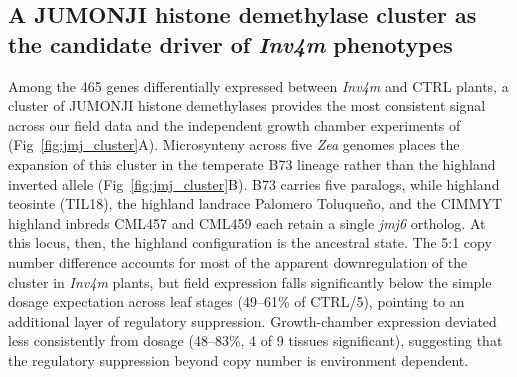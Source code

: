 \documentclass[9pt,twocolumn,twoside]{rilabRxiv}
\newcommand{\invfour}{\textit{Inv4m}\xspace}
\begin{document}


\subsection*{A JUMONJI histone demethylase cluster as the candidate driver of \invfour phenotypes}
 
Among the 465 genes differentially expressed between \invfour and CTRL plants, a cluster of JUMONJI histone demethylases provides the most consistent signal across our field data and the independent growth chamber experiments of \cite{crow2020} (Fig~\ref{fig:jmj_cluster}A).
Microsynteny across five \textit{Zea} genomes places the expansion of this cluster in the temperate B73 lineage rather than the highland inverted allele (Fig~\ref{fig:jmj_cluster}B).
B73 carries five paralogs, while highland teosinte (TIL18), the highland landrace Palomero Toluqueño, and the CIMMYT highland inbreds CML457 and CML459 each retain a single \textit{jmj6} ortholog.
At this locus, then, the highland configuration is the ancestral state.
The 5:1 copy number difference accounts for most of the apparent downregulation of the cluster in \invfour plants, but field expression falls significantly below the simple dosage expectation across leaf stages (49--61\% of CTRL/5), pointing to an additional layer of regulatory suppression.
Growth-chamber expression deviated less consistently from dosage (48--83\%, 4 of 9 tissues significant), suggesting that the regulatory suppression beyond copy number is environment dependent.
 
\end{document}
